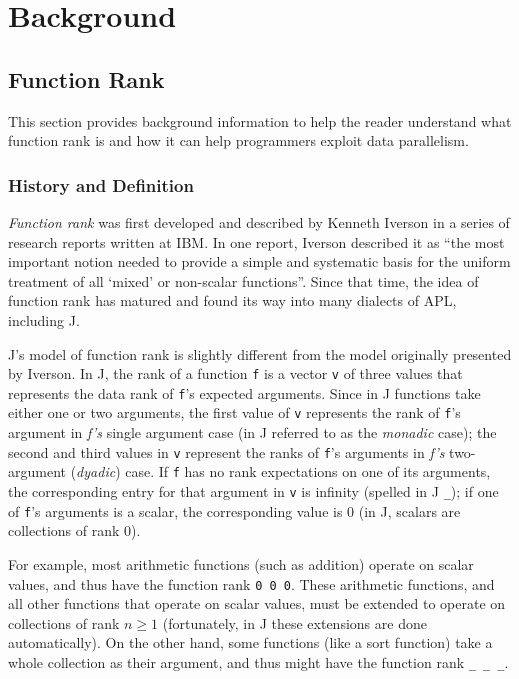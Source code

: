 \chapter{Background}
\label{back}

\section{Function Rank}
This section provides background information to help the reader understand 
what function rank is and how it can help programmers exploit data parallelism.

\subsection{History and Definition}
\textit{Function rank} was first developed and described by Kenneth Iverson in a series of research reports written at IBM\cite{rapl}\cite{opandfunc}. 
In one report, Iverson described it as 
``the most important notion needed to provide a simple and systematic basis for the uniform treatment of all `mixed' or non-scalar functions''\cite{rapl}. %
Since that time, the idea of function rank has matured and found its way into many dialects of APL, including J.

J's model of function rank is slightly different from the model originally presented by Iverson\cite{rankanduni}\cite{jvocab}. 
In J, the rank of a function \texttt{f} is a vector \texttt{v} of three values that represents the data rank of \texttt{f}'s expected arguments.
Since in J functions take either one or two arguments, 
the first value of \texttt{v} represents the rank of \texttt{f}'s argument in \textit{f's} single argument case 
(in J referred to as the \textit{monadic} case);
the second and third values in \texttt{v} represent the ranks of \texttt{f}'s arguments in \textit{f's} two-argument (\textit{dyadic}) case.
If \texttt{f} has no rank expectations on one of its arguments, the corresponding entry for that argument in \texttt{v} is infinity (spelled in J \texttt{\_});
if one of \texttt{f}'s arguments is a scalar, 
the corresponding value is 0 
(in J, scalars are collections of rank 0). %

For example, most arithmetic functions (such as addition) 
operate on scalar values, and thus have the function rank \texttt{0 0 0}.
These arithmetic functions, and all other functions that operate on scalar values, 
must be extended to operate on collections of rank $n \ge 1$ 
(fortunately, in J these extensions are done automatically).
On the other hand, some functions (like a sort function) take a whole collection as their argument, 
and thus might have the function rank \texttt{\_ \_ \_}.

